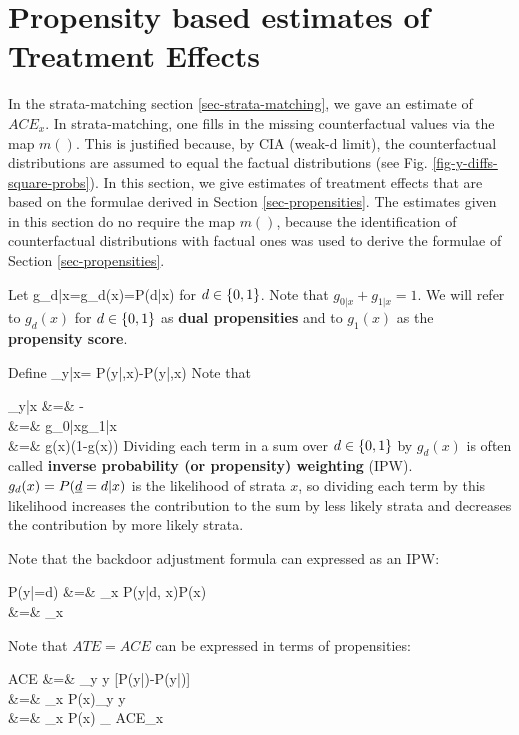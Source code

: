 \section{Propensity based  estimates of
Treatment Effects}

In the  strata-matching
section \ref{sec-strata-matching}, we gave an estimate
of $ACE_x$.
In strata-matching, one
fills in the missing
counterfactual values
via the map $m()$.
This is justified
because,
by CIA (weak-d limit),
the counterfactual
distributions
are assumed to equal
the factual distributions (see Fig.
\ref{fig-y-diffs-square-probs}).
In this
section,
we give estimates
of treatment effects that
are based on the  formulae derived
in Section \ref{sec-propensities}.
The estimates given in this section
do no require
the map $m()$, because
the identification of
counterfactual distributions
with factual ones was used to
derive the formulae
of  Section \ref{sec-propensities}.

Let
\beq
g_{d|x}=g_d(x)=P(d|x)
\eeq
 for $d\in\{0,1\}$.
Note that $g_{0|x}+g_{1|x}=1$.
We will
refer to $g_d(x)$
for $d\in \{0,1\}$
as {\bf dual propensities}
and to $g_1(x)$ as the
{\bf propensity score}.

Define
\beq
\delta_{y|x}=
P(y|,x)-P(y|,x)
\eeq
Note that

\beqa
\delta_{y|x}
&=&
-
\\
&=&
{
g_{0|x}g_{1|x}
}
\\
&=&
{
g(x)(1-g(x))
}
\eeqa
Dividing
each term
in a sum over $d\in \{0,1\}$
by $g_ d(x)$
is often called
 {\bf inverse probability (or propensity)
weighting} (IPW).
$g_ d(x)=P(\rvd= d|x)$ is the
likelihood of strata $x$,
so dividing each term by
this likelihood increases the
contribution to the sum
by less likely strata
and decreases the contribution by
more likely strata.




Note that the
backdoor adjustment formula
can  expressed
as an IPW:



\beqa
P(y|\cald\rvd=d)
&=&
\sum_x P(y|d, x)P(x)
\\
&=&
\sum_x 
\eeqa

Note that $ATE=ACE$ can be expressed
in terms of propensities:



\beqa
ACE
&=&
\sum_y y [P(y|\cald{})-P(y|\cald{})]
\\
&=&
\sum_x P(x)\sum_y y
\left[
P(y|d=1,x)
-
P(y|d=0,x)
\right]
\\&=&
\sum_x P(x)
_
{ACE_x}
\label{eq-ace-propensity}
\eeqa



